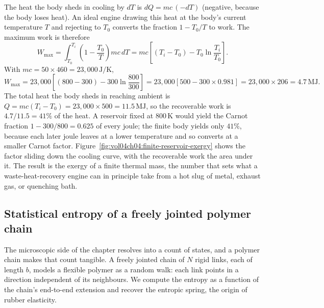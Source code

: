 The heat the body sheds in cooling by $dT$ is $dQ = mc\,(-dT)$ (negative,
because the body loses heat). An ideal engine drawing this heat at the
body's current temperature $T$ and rejecting to $T_0$ converts the
fraction $1 - T_0/T$ to work. The maximum work is therefore
\[
W_{\max} = \int_{T_0}^{T_i} \left(1 - \frac{T_0}{T}\right) mc\,dT
= mc\left[(T_i - T_0) - T_0 \ln\frac{T_i}{T_0}\right].
\]
With $mc = 50 \times 460 = 23{,}000\,\text{J}/\si{\kelvin}$,
\[
W_{\max} = 23{,}000\left[(800 - 300) - 300 \ln\frac{800}{300}\right]
= 23{,}000\left[500 - 300 \times 0.981\right]
= 23{,}000 \times 206 = 4.7\,\text{MJ}.
\]
The total heat the body sheds in reaching ambient is $Q = mc(T_i - T_0) =
23{,}000 \times 500 = 11.5\,\text{MJ}$, so the recoverable work is
$4.7/11.5 = 41\%$ of the heat. A reservoir fixed at $800\,\si{\kelvin}$
would yield the Carnot fraction $1 - 300/800 = 0.625$ of every joule; the
finite body yields only $41\%$, because each later joule leaves at a lower
temperature and so converts at a smaller Carnot factor.
Figure~\ref{fig:vol04ch04:finite-reservoir-exergy} shows the factor
sliding down the cooling curve, with the recoverable work the area under
it. The result is the exergy of a finite thermal mass, the number that
sets what a waste-heat-recovery engine can in principle take from a hot
slug of metal, exhaust gas, or quenching bath.



\subsection{Statistical entropy of a freely jointed polymer chain}

The microscopic side of the chapter resolves into a count of states, and
a polymer chain makes that count tangible. A freely jointed chain of $N$
rigid links, each of length $b$, models a flexible polymer as a random
walk: each link points in a direction independent of its neighbours. We
compute the entropy as a function of the chain's end-to-end extension and
recover the entropic spring, the origin of rubber elasticity.

